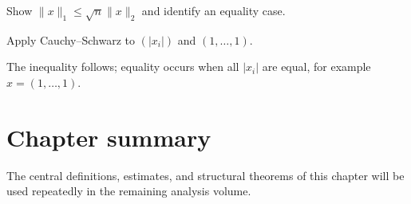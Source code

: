 \begin{exercise}\label{exr:ii02-expand-16}
Show \(\|x\|_1\le\sqrt n\|x\|_2\) and identify an equality case.
\end{exercise}
\begin{hint}
Apply Cauchy--Schwarz to \((|x_i|)\) and \((1,\dots,1)\).
\end{hint}
\begin{solution}
The inequality follows; equality occurs when all \(|x_i|\) are equal, for example \(x=(1,\dots,1)\).
\end{solution}
\section*{Chapter summary}
The central definitions, estimates, and structural theorems of this chapter will be used repeatedly in the remaining analysis volume.
